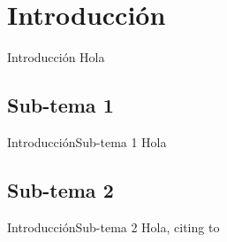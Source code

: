 \section{Introducción}
\begin{frame}{Introducción}
  Hola
\end{frame}

\subsection{Sub-tema 1}
\begin{frame}{Introducción}{Sub-tema 1}
  Hola
\end{frame}


\subsection{Sub-tema 2}
\begin{frame}{Introducción}{Sub-tema 2}
  Hola, citing to \cite{devlin2018bert}
\end{frame}

